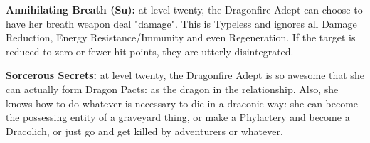 \textbf{Annihilating Breath (Su):} at level twenty, the Dragonfire Adept can choose to have her breath weapon deal "damage". This is Typeless and ignores all Damage Reduction, Energy Resistance/Immunity and even Regeneration. If the target is reduced to zero or fewer hit points, they are utterly disintegrated. 

\textbf{Sorcerous Secrets:} at level twenty, the Dragonfire Adept is so awesome that she can actually form Dragon Pacts: as the dragon in the relationship. Also, she knows how to do whatever is necessary to die in a draconic way: she can become the possessing entity of a graveyard thing, or make a Phylactery and become a Dracolich, or just go and get killed by adventurers or whatever.